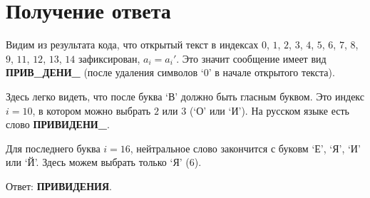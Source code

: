 \documentclass{article}
\begin{document}
\section{Получение ответа}

Видим из результата кода, что открытый текст в индексах $0$, $1$, $2$, $3$, $4$, $5$, $6$, $7$, $8$, $9$, $11$, $12$, $13$, $14$ зафиксирован, $a_i = a_i'$. Это значит сообщение имеет вид \textbf{ПРИВ\_ДЕНИ\_} (после удаления символов `0' в начале открытого текста).

Здесь легко видеть, что после буква `В' должно быть гласным буквом. Это индекс $i = 10$, в котором можно выбрать $2$ или $3$ (`О' или `И'). На русском языке есть слово \textbf{ПРИВИДЕНИ\_}.

Для последнего буква $i = 16$, нейтральное слово закончится с буковм `Е', `Я', `И' или `Й'. Здесь можем выбрать только `Я' (6).

Ответ: \textbf{ПРИВИДЕНИЯ}.
\end{document}
